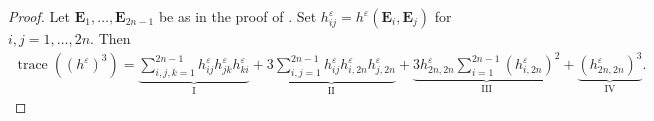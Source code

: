 \documentclass[11pt]{amsart}
\newcommand{\eps}{\varepsilon}
\newcommand{\E}{\mathbf{E}}
\DeclareMathOperator{\trace}{trace}
\theoremstyle{definition}
\theoremstyle{remark}
\numberwithin{equation}{section}
\begin{document}
\begin{proof}
     Let $\E_1,\ldots,\E_{2n-1}$ be as in the proof of . Set $h^\eps_{ij}=h^\eps(\E_i,\E_j)$ for $i,j=1,\ldots,2n$. Then
      \begin{equation*}
          \begin{split}
              \trace\left(\left(h^\eps\right)^3\right)%
              =\underbrace{\sum_{i,j,k=1 }^{2n-1}h^\eps_{ij}h^\eps_{jk}h^\eps_{ki}}_\mathrm{I}+\underbrace{3\sum_{i,j=1 }^{2n-1}h^\eps_{ij}h^\eps_{i,2n}h^\eps_{j,2n}}_\mathrm{II}+\underbrace{3h^\eps_{2n,2n}\sum_{i=1}^{2n-1}\left(h^\eps_{i,2n}\right)^2}_\mathrm{III}+\underbrace{\left(h^\eps_{2n,2n}\right)^3}_\mathrm{IV}.
          \end{split}
      \end{equation*}

\end{proof}
\end{document}
